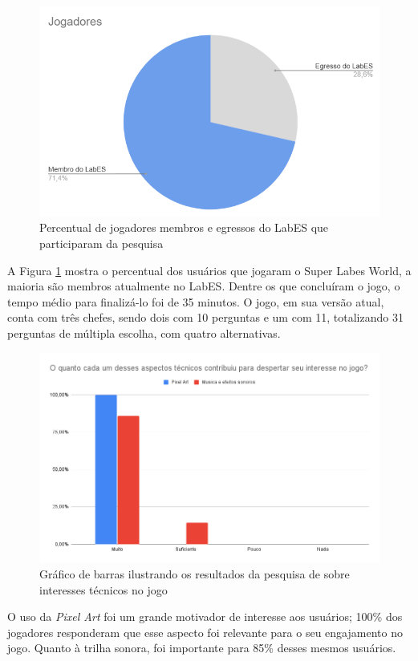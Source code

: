 \begin{figure}[h!]
    \centering
    \includegraphics[width=0.8\linewidth]{figuras/players-pizza.png}
    \caption{Percentual de jogadores membros e egressos do LabES que participaram da pesquisa}
    \label{fig:players-pizza}
\end{figure}

A Figura \ref{fig:players-pizza} mostra o percentual dos usuários que jogaram o Super Labes World, a maioria são membros atualmente no LabES. Dentre os que concluíram o jogo, o tempo médio para finalizá-lo foi de 35 minutos. O jogo, em sua versão atual, conta com três chefes, sendo dois com 10 perguntas e um com 11, totalizando 31 perguntas de múltipla escolha, com quatro alternativas. 

\begin{figure}[h!]
    \centering
    \includegraphics[width=1\linewidth]{figuras/graph-2.png}
    \caption{Gráfico de barras ilustrando os resultados da pesquisa de sobre interesses técnicos no jogo}
    \label{fig:graph-2}
\end{figure}
\clearpage
O uso da \textit{Pixel Art} foi um grande motivador de interesse aos usuários; 100\% dos jogadores responderam que esse aspecto foi relevante para o seu engajamento no jogo. Quanto à trilha sonora, foi importante para 85\% desses mesmos usuários.

